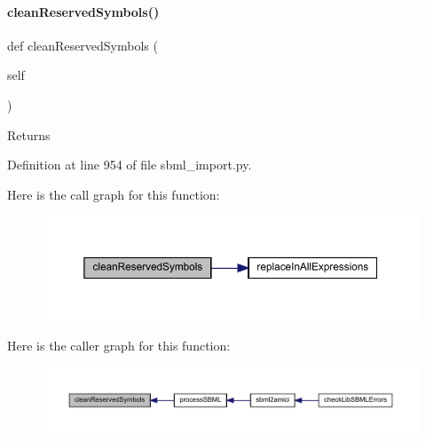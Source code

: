 \paragraph{\texorpdfstring{clean\+Reserved\+Symbols()}{cleanReservedSymbols()}}
{\footnotesize\ttfamily def clean\+Reserved\+Symbols (\begin{DoxyParamCaption}\item[{}]{self }\end{DoxyParamCaption})}

\begin{DoxyReturn}{Returns}

\end{DoxyReturn}


Definition at line 954 of file sbml\+\_\+import.\+py.

Here is the call graph for this function\+:
\nopagebreak
\begin{figure}[H]
\begin{center}
\leavevmode
\includegraphics[width=350pt]{classamici_1_1sbml__import_1_1_sbml_importer_a122b9921e2fb5bd0fc75310c47413dd1_cgraph}
\end{center}
\end{figure}
Here is the caller graph for this function\+:
\nopagebreak
\begin{figure}[H]
\begin{center}
\leavevmode
\includegraphics[width=350pt]{classamici_1_1sbml__import_1_1_sbml_importer_a122b9921e2fb5bd0fc75310c47413dd1_icgraph}
\end{center}
\end{figure}
\mbox{\label{classamici_1_1sbml__import_1_1_sbml_importer_a5348e7b5041334f8c54b45c5c928dea0}} 

